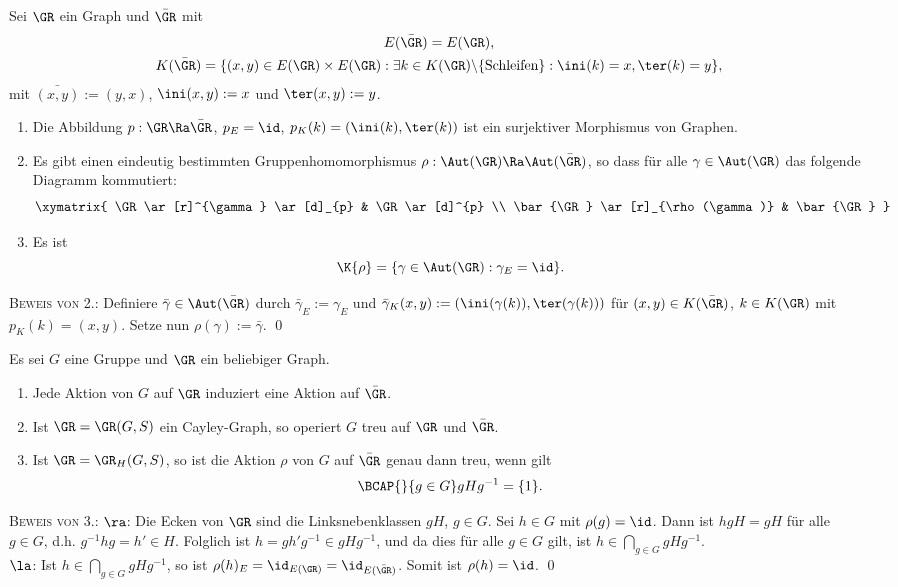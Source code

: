\BEM Sei $\GR$ ein Graph und $\bar{\GR}$ mit
\begin{gather*}
E(\bar{\GR}) = E(\GR), \\
K(\bar{\GR}) =
\{(x,y)\in E(\GR)\times E(\GR) : \exists k\in
	K(\GR)\backslash\{\text{Schleifen}\}:
	\ini(k)=x, \ter(k)=y \},
\end{gather*}
mit $\bar{(x,y)}:=(y,x)$, $\ini(x,y):=x$ und $\ter(x,y):=y$.
\begin{enumerate}
\item Die Abbildung $p:\GR\Ra\bar{\GR}$, $p_E=\id$,
$p_K(k)=(\ini(k),\ter(k))$ ist ein surjektiver Morphismus von
Graphen.
\item Es gibt einen eindeutig bestimmten Gruppenhomomorphismus
$\rho:\Aut(\GR)\Ra\Aut(\bar{\GR})$, so dass für alle
$\gamma\in\Aut(\GR)$ das folgende Diagramm kommutiert:
\[\xymatrix{
\GR \ar[r]^{\gamma} \ar[d]_{p} & \GR \ar[d]^{p} \\
\bar{\GR} \ar[r]_{\rho(\gamma)} & \bar{\GR}
}\]
\item
Es ist
\[
\K{\rho} = \{ \gamma\in\Aut(\GR) : \gamma_E=\id \}.
\]
\end{enumerate}
\textsc{Beweis von 2.:} Definiere $\bar{\gamma}\in\Aut(\bar{\GR})$
durch $\bar{\gamma}_E := \gamma_E$ und
$\bar{\gamma}_K(x,y) := (\ini(\gamma(k)),\ter(\gamma(k)))$
für $(x,y)\in K(\bar{\GR})$, $k\in K(\GR)$ mit $p_K(k)=(x,y)$.
Setze nun $\rho(\gamma):=\bar{\gamma}$.
\qed

\FOLG Es sei $G$ eine Gruppe und $\GR$ ein beliebiger Graph.
\begin{enumerate}
\item Jede Aktion von $G$ auf $\GR$ induziert eine Aktion auf
$\bar{\GR}$.
\item Ist $\GR=\GR(G,S)$ ein Cayley-Graph, so operiert $G$ treu
auf $\GR$ und $\bar{\GR}$.
\item Ist $\GR=\GR_H(G,S)$, so ist die Aktion $\rho$ von $G$ auf
$\bar{\GR}$ genau dann treu, wenn gilt
\[
\BCAP{}{g\in G} gHg^{-1} = \{1\}.
\]
\end{enumerate}
\textsc{Beweis von 3.:} \glqq$\ra$\grqq:
Die Ecken von $\GR$ sind die Linksnebenklassen
$gH$, $g\in G$. Sei $h\in G$ mit $\rho(g)=\id$. Dann ist
$hgH=gH$ für alle $g\in G$, d.h. $g^{-1}hg=h'\in H$.
Folglich ist $h=gh'g^{-1}\in gHg^{-1}$, und da dies für alle
$g\in G$ gilt, ist $h\in \bigcap_{g\in G} gHg^{-1}$.\\
\glqq$\la$\grqq: Ist $h\in \bigcap_{g\in G} gHg^{-1}$, so ist
$\rho(h)_E=\id_{E(\GR)}=\id_{E(\bar{\GR})}$.
Somit ist $\rho(h)=\id$.
\qed

